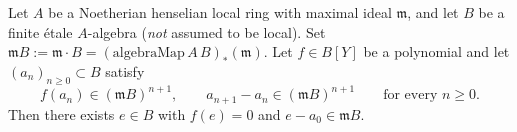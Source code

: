 
\begin{lemma}

\label{lem:henselianPair-l3a-newton-root}
Let $A$ be a Noetherian henselian local ring with maximal ideal
$\mathfrak m$, and let $B$ be a finite étale $A$-algebra (\emph{not}
assumed to be local). Set $\mathfrak m B := \mathfrak m \cdot B =
(\mathrm{algebraMap}\,A\,B)_*(\mathfrak m)$. Let $f \in B[Y]$ be a
polynomial and let $(a_n)_{n \ge 0} \subset B$ satisfy
\[
  f(a_n) \in (\mathfrak m B)^{n+1},
  \qquad
  a_{n+1} - a_n \in (\mathfrak m B)^{n+1}
  \qquad \text{for every } n \ge 0.
\]
Then there exists $e \in B$ with $f(e) = 0$ and $e - a_0 \in \mathfrak
m B$.
\end{lemma}

